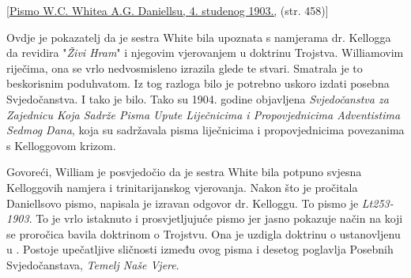 [\href{https://ellenwhite.org/letterbooks/555}{Pismo W.C. Whitea A.G. Daniellsu, 4. studenog 1903.,} (str. 458)]

Ovdje je pokazatelj da je sestra White bila upoznata s namjerama dr. Kellogga da revidira "\textit{Živi Hram}" i njegovim vjerovanjem u doktrinu Trojstva. Williamovim riječima, ona se vrlo nedvosmisleno izrazila glede te stvari. Smatrala je to beskorisnim poduhvatom. Iz tog razloga bilo je potrebno uskoro izdati posebna Svjedočanstva. I tako je bilo. Tako su 1904. godine objavljena \textit{Svjedočanstva za Zajednicu Koja Sadrže Pisma Upute Liječnicima i Propovjednicima Adventistima Sedmog Dana}, koja su sadržavala pisma liječnicima i propovjednicima povezanima s Kelloggovom krizom.

Govoreći, William je posvjedočio da je sestra White bila potpuno svjesna Kelloggovih namjera i trinitarijanskog vjerovanja. Nakon što je pročitala Daniellsovo pismo, napisala je izravan odgovor dr. Kelloggu. To pismo je \textit{Lt253-1903}. To je vrlo istaknuto i prosvjetljujuće pismo jer jasno pokazuje način na koji se proročica bavila doktrinom o Trojstvu. Ona je uzdigla doktrinu o  ustanovljenu u . Postoje upečatljive sličnosti između ovog pisma i desetog poglavlja Posebnih Svjedočanstava, \textit{Temelj Naše Vjere}.
